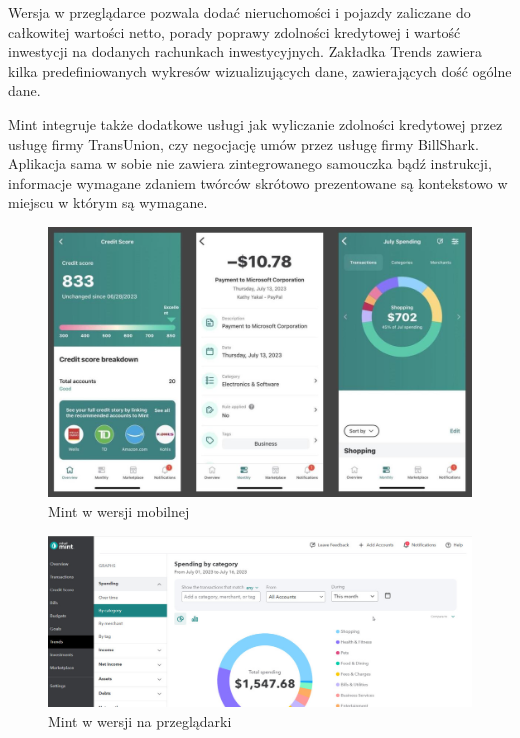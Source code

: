 \documentclass[a4paper, 10pt, twoside, openright]{report}
\begin{document}
\begin{large}
{Wersja w przeglądarce pozwala dodać nieruchomości i pojazdy zaliczane do 
całkowitej wartości netto, porady poprawy zdolności kredytowej i wartość 
inwestycji na dodanych rachunkach inwestycyjnych. Zakładka Trends zawiera 
kilka predefiniowanych wykresów wizualizujących dane, zawierających dość ogólne 
dane.}

{Mint integruje także dodatkowe usługi jak wyliczanie zdolności kredytowej przez 
usługę firmy TransUnion, czy negocjację umów przez usługę firmy BillShark. 
Aplikacja sama w sobie nie zawiera zintegrowanego samouczka bądź instrukcji, 
informacje wymagane zdaniem twórców skrótowo prezentowane są kontekstowo w miejscu w 
którym są wymagane.}

\begin{figure}[H]           %
    \centering
    \includegraphics[width=12cm]{figures/pcmag_mintmobile_05OMSsUmroXJ6F6sETKpH9R-50.fit_lim.size_1152x.jpg}
    \caption{Mint w wersji mobilnej}
    \label{mintmobile}
\end{figure}

\begin{figure}[H]           %
    \centering
    \includegraphics[width=12cm]{figures/pcmag_mintweb_05OMSsUmroXJ6F6sETKpH9R-51.fit_lim.size_1152x.jpg}
    \caption{Mint w wersji na przeglądarki}
    \label{fig:mintweb}
\end{figure}


\end{large}
\end{document}
